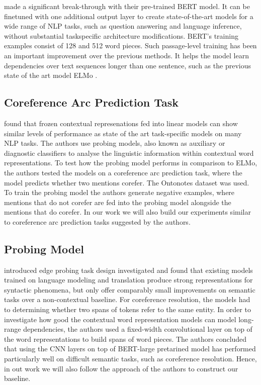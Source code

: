 \documentclass[11pt]{article}
\begin{document}
\textcite{devlin2019bert} made a significant break-through with their pre-trained BERT model. It can be finetuned with one additional output layer
to create state-of-the-art models for a wide
range of NLP tasks, such as question answering and language inference, without substantial taskspecific architecture modifications. BERT's training examples consist of 128 and 512 word pieces. Such passage-level training has been an important improvement over the previous methods. It helps the model learn dependencies over text sequences longer than one sentence, such as the previous state of the art model ELMo \parencite{peters2018elmo}.



\subsection{Coreference Arc Prediction Task}

 \textcite{liu2019linguistic} found that frozen contextual represenations fed into linear models can show similar levels of performance as state of the art task-specific models on many NLP tasks. The authors use probing models, also known as auxiliary or diagnostic classifiers \parencite{shi2016string, kadar2017representation} to analyse the linguistic information within contextual word representations. To test how the probing model performs in comparison to ELMo, the authors tested the models on a coreference arc prediction task, where the model predicts whether two mentions corefer. The Ontonotes dataset was used. To train the probing model the authors generate negative examples, where mentions that do not corefer are fed into the probing model alongside the mentions that do corefer. In our work we will also build our experiments similar to coreference arc prediction tasks suggested by the authors.

\subsection{Probing Model}



\textcite{tenney2019context} introduced edge probing task design investigated and found that existing models trained on language modeling and translation produce strong representations for syntactic phenomena, but only offer comparably small improvements on semantic tasks over a non-contextual baseline. For coreference resolution, the models had to determining whether two spans of tokens refer to the same entity. In order to investigate how good the contextual word representation models can model long-range dependencies, the authors used a fixed-width convolutional layer on top of the word representations to build spans of word pieces. The authors concluded that using the CNN layers on top of BERT-large pretarined model has performed particularly well on difficult semantic tasks, such as coreference resolution. Hence, in out work we will also follow the approach of the authors to construct our baseline. 
\end{document}
